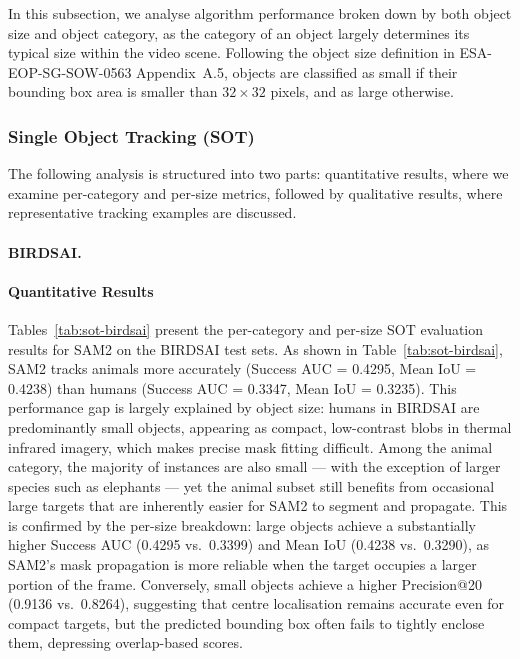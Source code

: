 \documentclass[11pt]{article}
\begin{document}
In this subsection, we analyse algorithm performance broken down by both object size and object category,
as the category of an object largely determines its typical size within the video scene.
Following the object size definition in ESA-EOP-SG-SOW-0563 Appendix~A.5, objects are classified as small if their bounding box area is smaller than $32\times32$ pixels, and as large otherwise.

\hypertarget{Single Object Tracking (SOT)}{%
\subsubsection{Single Object Tracking (SOT)}\label{SOT}}

The following analysis is structured into two parts: quantitative results, where we examine per-category and per-size metrics, 
followed by qualitative results, where representative tracking examples are discussed.

\paragraph{BIRDSAI.}

\paragraph{Quantitative Results}\label{SOT_Quantitative}

Tables~\ref{tab:sot-birdsai} present the per-category and per-size SOT evaluation results for SAM2 on the BIRDSAI test sets. As shown in Table~\ref{tab:sot-birdsai}, SAM2 tracks animals more accurately (Success AUC = 0.4295, Mean IoU = 0.4238) than humans (Success AUC = 0.3347, Mean IoU = 0.3235).
This performance gap is largely explained by object size: humans in BIRDSAI are predominantly small objects, appearing as compact, low-contrast blobs in thermal infrared imagery, which makes precise mask fitting difficult.
Among the animal category, the majority of instances are also small — with the exception of larger species such as elephants — yet the animal subset still benefits from occasional large targets that are inherently easier for SAM2 to segment and propagate.
This is confirmed by the per-size breakdown: large objects achieve a substantially higher Success AUC (0.4295 vs.\ 0.3399) and Mean IoU (0.4238 vs.\ 0.3290), as SAM2's mask propagation is more reliable when the target occupies a larger portion of the frame.
Conversely, small objects achieve a higher Precision@20 (0.9136 vs.\ 0.8264), suggesting that centre localisation remains accurate even for compact targets, but the predicted bounding box often fails to tightly enclose them, depressing overlap-based scores.
\end{document}

